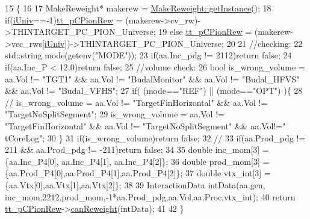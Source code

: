 \begin{DoxyCode}
15                                                                        \{
16 
17     MakeReweight*  makerew =  \hyperlink{class_neutrino_flux_reweight_1_1_make_reweight_a42d1fa92a1e30bd80538188e0c9d8b4a}{MakeReweight::getInstance}();
18     \textcolor{keywordflow}{if}(\hyperlink{class_neutrino_flux_reweight_1_1_thin_targetn_c_pion_reweighter_a4739c4b376e4e9d4a1b6968efddf41d8}{iUniv}==-1)\hyperlink{class_neutrino_flux_reweight_1_1_thin_targetn_c_pion_reweighter_a3cd598e2a95c1cf40db298236f3551c9}{tt\_pCPionRew} = (makerew->cv\_rw)->THINTARGET\_PC\_PION\_Universe;
19     \textcolor{keywordflow}{else} \hyperlink{class_neutrino_flux_reweight_1_1_thin_targetn_c_pion_reweighter_a3cd598e2a95c1cf40db298236f3551c9}{tt\_pCPionRew} = (makerew->vec\_rws[\hyperlink{class_neutrino_flux_reweight_1_1_thin_targetn_c_pion_reweighter_a4739c4b376e4e9d4a1b6968efddf41d8}{iUniv}])->THINTARGET\_PC\_PION\_Universe;
20     
21     \textcolor{comment}{//checking:}
22     std::string mode(getenv(\textcolor{stringliteral}{"MODE"}));
23     \textcolor{keywordflow}{if}(aa.Inc\_pdg != 2112)\textcolor{keywordflow}{return} \textcolor{keyword}{false};
24     \textcolor{keywordflow}{if}(aa.Inc\_P < 12.0)\textcolor{keywordflow}{return} \textcolor{keyword}{false};
25     \textcolor{comment}{//volume check: }
26     \textcolor{keywordtype}{bool} is\_wrong\_volume = aa.Vol != \textcolor{stringliteral}{"TGT1"} && aa.Vol != \textcolor{stringliteral}{"BudalMonitor"} && aa.Vol != \textcolor{stringliteral}{"Budal\_HFVS"} && aa.Vol
       != \textcolor{stringliteral}{"Budal\_VFHS"};
27     \textcolor{keywordflow}{if}( (mode==\textcolor{stringliteral}{"REF"}) || (mode==\textcolor{stringliteral}{"OPT"}) )\{
28      \textcolor{comment}{// is\_wrong\_volume = aa.Vol != "TargetFinHorizontal" && aa.Vol != "TargetNoSplitSegment";}
29       is\_wrong\_volume = aa.Vol != \textcolor{stringliteral}{"TargetFinHorizontal"} && aa.Vol != \textcolor{stringliteral}{"TargetNoSplitSegment"} && aa.Vol!=\textcolor{stringliteral}{"
      tCoreLog"};     
30     \}
31     \textcolor{keywordflow}{if}(is\_wrong\_volume)\textcolor{keywordflow}{return} \textcolor{keyword}{false};
32     \textcolor{comment}{//}
33     \textcolor{keywordflow}{if}(aa.Prod\_pdg != 211 && aa.Prod\_pdg != -211)\textcolor{keywordflow}{return} \textcolor{keyword}{false};
34     
35     \textcolor{keywordtype}{double} inc\_mom[3]  = \{aa.Inc\_P4[0], aa.Inc\_P4[1], aa.Inc\_P4[2]\};
36     \textcolor{keywordtype}{double} prod\_mom[3] = \{aa.Prod\_P4[0],aa.Prod\_P4[1],aa.Prod\_P4[2]\};
37     \textcolor{keywordtype}{double} vtx\_int[3]  = \{aa.Vtx[0],aa.Vtx[1],aa.Vtx[2]\};
38     
39     InteractionData intData(aa.gen, inc\_mom,2212,prod\_mom,-1*aa.Prod\_pdg,aa.Vol,aa.Proc,vtx\_int);
40     \textcolor{keywordflow}{return} \hyperlink{class_neutrino_flux_reweight_1_1_thin_targetn_c_pion_reweighter_a3cd598e2a95c1cf40db298236f3551c9}{tt\_pCPionRew}->\hyperlink{class_neutrino_flux_reweight_1_1_thin_targetp_c_pion_reweighter_a09067dcacb294ca133e2660d61302e85}{canReweight}(intData);
41     
42   \}
\end{DoxyCode}


